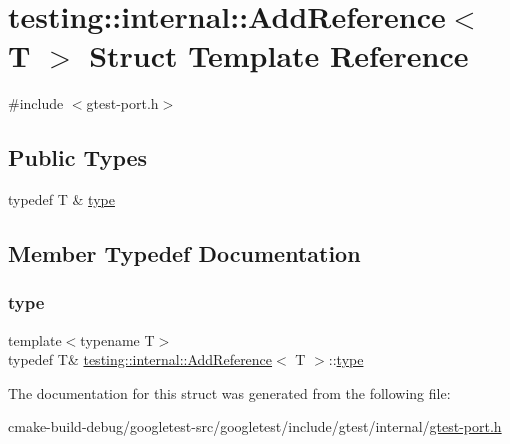 \hypertarget{structtesting_1_1internal_1_1AddReference}{}\section{testing\+::internal\+::Add\+Reference$<$ T $>$ Struct Template Reference}
\label{structtesting_1_1internal_1_1AddReference}


{\ttfamily \#include $<$gtest-\/port.\+h$>$}

\subsection*{Public Types}
\begin{DoxyCompactItemize}
\item 
typedef T \& \mbox{\hyperlink{structtesting_1_1internal_1_1AddReference_a2df8dd7c4e41f6390e6e66b1a9a67bb4}{type}}
\end{DoxyCompactItemize}


\subsection{Member Typedef Documentation}
\mbox{\label{structtesting_1_1internal_1_1AddReference_a2df8dd7c4e41f6390e6e66b1a9a67bb4}} 
\subsubsection{\texorpdfstring{type}{type}}
{\footnotesize\ttfamily template$<$typename T$>$ \\
typedef T\& \mbox{\hyperlink{structtesting_1_1internal_1_1AddReference}{testing\+::internal\+::\+Add\+Reference}}$<$ T $>$\+::\mbox{\hyperlink{structtesting_1_1internal_1_1AddReference_a2df8dd7c4e41f6390e6e66b1a9a67bb4}{type}}}



The documentation for this struct was generated from the following file\+:\begin{DoxyCompactItemize}
\item 
cmake-\/build-\/debug/googletest-\/src/googletest/include/gtest/internal/\mbox{\hyperlink{gtest-port_8h}{gtest-\/port.\+h}}\end{DoxyCompactItemize}
